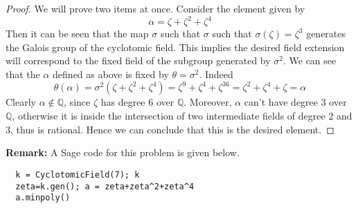 \documentclass[11pt,letterpaper]{article}
\newcounter{problem}
\DeclareMathOperator{\1}{\mathbbm{1}}
\begin{document}
\begin{proof}
  We will prove two items at once. Consider the element given by
  \[\alpha = \zeta + \zeta^2+\zeta^4\]
  Then it can be seen that the map $\sigma$ such that $\sigma$ such that $\sigma(\zeta) = \zeta^3$ generates the Galois group of the cyclotomic field. This implies the desired field extension will correspond
  to the fixed field of the subgroup generated by $\sigma^2$. We can see that the $\alpha$ defined as above
  is fixed by $\theta=\sigma^2$. Indeed
  \[\theta(\alpha) = \sigma^2(\zeta + \zeta^2+\zeta^4) = \zeta^9 + \zeta^4+\zeta^{36} = \zeta^2 + \zeta^4+\zeta = \alpha\]
  Clearly $\alpha \notin \mathbb{Q}$, since $\zeta$ has degree $6$ over $\mathbb{Q}$. Moreover, $\alpha$ can't have degree $3$ over $\mathbb{Q}$,
  otherwise it is inside the intersection of two intermediate fields of degree $2$ and $3$, thus is rational.
  Hence we can conclude that this is the desired element.
\end{proof}
\textbf{Remark:} A Sage code for this problem is given below.
\begin{verbatim}
  k = CyclotomicField(7); k 
  zeta=k.gen(); a = zeta+zeta^2+zeta^4
  a.minpoly()
\end{verbatim}
\end{document}
